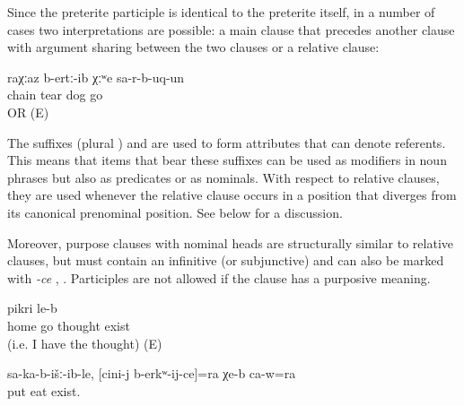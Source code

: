 Since the preterite participle is identical to the preterite itself, in a number of cases two interpretations are possible: a main clause that precedes another clause with argument sharing between the two clauses or a relative clause:
%
\begin{exe}
	\ex	
	\gll	raχːaz	b-ertː-ib	χːʷe	sa-r-b-uq-un\\
		chain	tear	dog	go\\
	\glt	{} OR  (E)
\end{exe}

The suffixes  (plural ) and  are used to form attributes that can denote referents. This means that items that bear these suffixes can be used as modifiers in noun phrases but also as predicates or as nominals. With respect to relative clauses, they are used whenever the relative clause occurs in a position that diverges from its canonical prenominal position. See  below for a discussion.

Moreover, purpose clauses with nominal heads are structurally similar to relative clauses, but must contain an infinitive (or subjunctive) and can also be marked with \textit{-ce} , . Participles are not allowed if the clause has a purposive meaning.
%
\begin{exe}
	\ex	\label{ex:There is the thought (i.e. I have the thought) to go home}
	\gll	[du	qili	uq'-ij]	pikri	le-b\\
			home	go	thought	exist \\
	\glt	{} (i.e. I have the thought) (E)

	\ex	\label{ex:‎He is also there (something) to eat that has been placed in front of him for him}
	\gll	sa-ka-b-išː-ib-le,	[cini-j	b-erkʷ-ij-ce]=ra	χe-b	ca-w=ra\\
		put		eat	exist.	\\
	\glt	{}
\end{exe}

